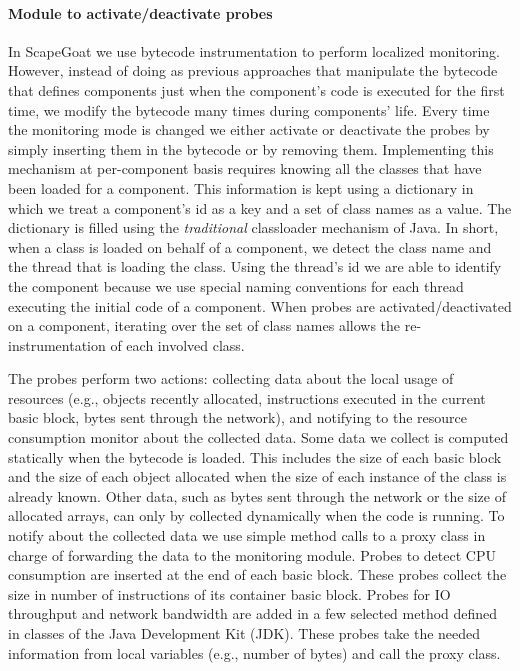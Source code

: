\paragraph{Module to activate/deactivate probes}
In ScapeGoat  we use bytecode instrumentation to perform localized monitoring.
However, instead of doing as previous approaches that manipulate the bytecode that defines components just when the component's code is executed for the first time, we modify the bytecode many times during components' life.
Every time the monitoring mode is changed we either activate or deactivate the probes by simply inserting them in the bytecode or by removing them. 
Implementing this mechanism at per-component basis requires knowing all the classes that have been loaded for a component.
This information is kept using a dictionary in which we treat a component's id as a key and a set of class names as a value.
The dictionary is filled using the \textit{traditional} classloader mechanism of Java.
In short, when a class is loaded on behalf of a component, we detect the class name and the thread that is loading the class.
Using the thread's id we are able to identify the component because we use special naming conventions for each thread executing the initial code of a component.
When probes are activated/deactivated on a component, iterating over the set of class names allows the re-instrumentation of each involved class.

The probes perform two actions: collecting data about the local usage of resources (e.g., objects recently allocated, instructions executed in the current basic block, bytes sent through the network), and notifying to the resource consumption monitor about the collected data. 
Some data we collect is computed statically when the bytecode is loaded.
This includes the size of each basic block and the size of each object allocated when the size of each instance of the class is already known.
Other data, such as bytes sent through the network or the size of allocated arrays, can only by collected dynamically when the code is running.
To notify about the collected data we use simple method calls to a proxy class in charge of forwarding the data to the monitoring module.
Probes to detect CPU consumption are inserted at the end of each basic block.
These probes collect the size in number of instructions of its container basic block.
Probes for IO throughput and network bandwidth are added in a few selected method defined in classes of the Java Development Kit (JDK).
These probes take the needed information from local variables (e.g., number of bytes) and call the proxy class. 

